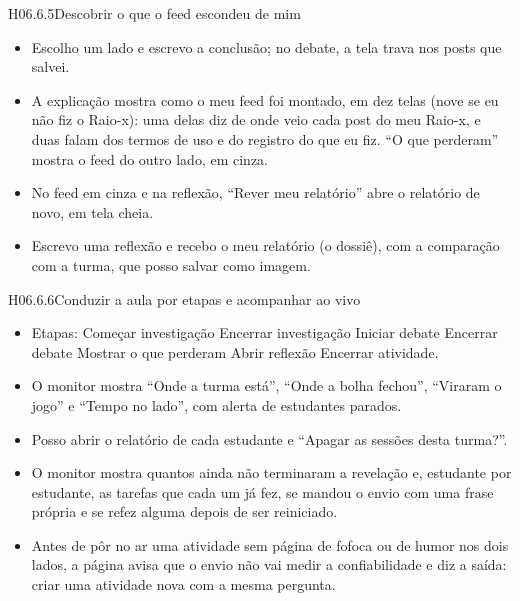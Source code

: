 \begin{historia}{H06.6.5}{Descobrir o que o feed escondeu de mim}{\pronto}
\aceite
\begin{itemize}
  \item Escolho um lado e escrevo a conclusão; no debate, a tela trava nos
    posts que salvei.
  \item A explicação mostra como o meu feed foi montado, em dez telas (nove se
    eu não fiz o Raio-x): uma delas diz de onde veio cada post do meu Raio-x,
    e duas falam dos termos de uso e do registro do que eu fiz. \enquote{O que
    perderam} mostra o feed do outro lado, em cinza.
  \item No feed em cinza e na reflexão, \enquote{Rever meu relatório} abre o
    relatório de novo, em tela cheia.
  \item Escrevo uma reflexão e recebo o meu relatório (o dossiê), com a
    comparação com a turma, que posso salvar como imagem.
\end{itemize}
\end{historia}

\begin{historia}{H06.6.6}{Conduzir a aula por etapas e acompanhar ao vivo}{\pronto}
\aceite
\begin{itemize}
  \item Etapas: Começar investigação \seta{} Encerrar investigação \seta{}
    Iniciar debate \seta{} Encerrar debate \seta{} Mostrar o que perderam
    \seta{} Abrir reflexão \seta{} Encerrar atividade.
  \item O monitor mostra \enquote{Onde a turma está}, \enquote{Onde a bolha
    fechou}, \enquote{Viraram o jogo} e \enquote{Tempo no lado}, com alerta de
    estudantes parados.
  \item Posso abrir o relatório de cada estudante e \enquote{Apagar as sessões
    desta turma?}.
  \item O monitor mostra quantos ainda não terminaram a revelação e, estudante
    por estudante, as tarefas que cada um já fez, se mandou o envio com uma
    frase própria e se refez alguma depois de ser reiniciado.
  \item Antes de pôr no ar uma atividade sem página de fofoca ou de humor nos
    dois lados, a página avisa que o envio não vai medir a confiabilidade e
    diz a saída: criar uma atividade nova com a mesma pergunta.
\end{itemize}
\end{historia}

